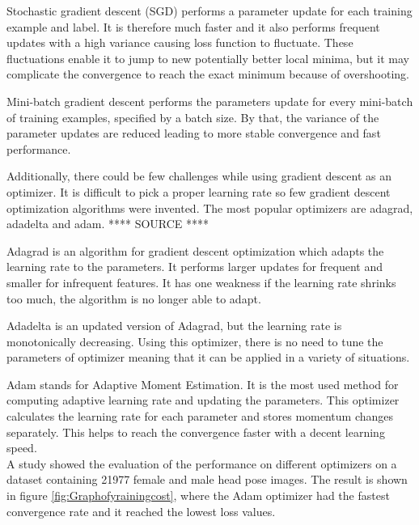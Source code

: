 \noindent
Stochastic gradient descent (SGD) performs a parameter update for each training example and label. It is therefore much faster and it also performs frequent updates with a high variance causing loss function to fluctuate. These fluctuations enable it to jump to new potentially better local minima, but it may complicate the convergence to reach the exact minimum because of overshooting.\citep{Zhang2014}

\noindent
Mini-batch gradient descent performs the parameters update for every mini-batch of training examples, specified by a batch size. By that, the variance of the parameter updates are reduced leading to more stable convergence and fast performance.\citep{Ruder2016}

\noindent
Additionally, there could be few challenges while using gradient descent as an optimizer. It is difficult to pick a proper learning rate so few gradient descent optimization algorithms were invented. The most popular optimizers are adagrad, adadelta and adam. **** SOURCE ****


\noindent
Adagrad is an algorithm for gradient descent optimization which adapts the learning rate to the parameters. It performs larger updates for frequent and smaller for infrequent features. It has one weakness if the learning rate shrinks too much, the algorithm is no longer able to adapt.\citep{Ruder2016}

\noindent
Adadelta is an updated version of Adagrad, but the learning rate is monotonically decreasing. Using this optimizer, there is no need to tune the parameters of optimizer meaning that it can be applied in a variety of situations.\citep{Ruder2016}

\noindent
Adam stands for Adaptive Moment Estimation. It is the most used method for computing adaptive learning rate and updating the parameters.  This optimizer calculates the learning rate for each parameter and stores momentum changes separately. This helps to reach the convergence faster with a decent learning speed.\citep{Kingma2015}\\

\noindent
A study \citeauthor{Patacchiola2017} showed the evaluation of the performance on different optimizers on a dataset containing 21977 female and male head pose images. The result is shown in figure \ref{fig:Graphofyrainingcost}, where the Adam optimizer had the fastest convergence rate and it reached the lowest loss values. 

